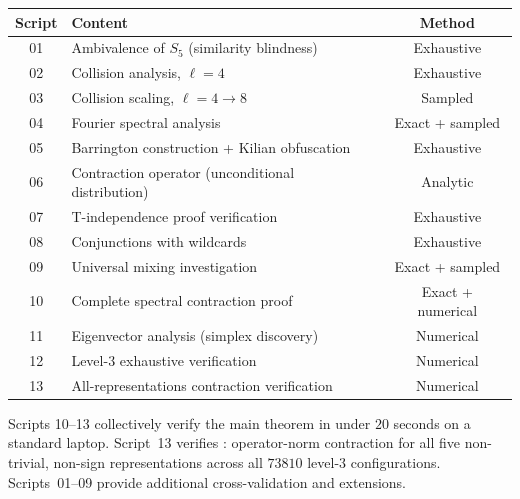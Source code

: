 \documentclass[11pt]{article}
\begin{document}
\begin{center}
\begin{tabular}{clc}
\toprule
Script & Content & Method \\
\midrule
01 & Ambivalence of $S_5$ (similarity blindness) & Exhaustive \\
02 & Collision analysis, $\ell = 4$ & Exhaustive \\
03 & Collision scaling, $\ell = 4 \to 8$ & Sampled \\
04 & Fourier spectral analysis & Exact + sampled \\
05 & Barrington construction + Kilian obfuscation & Exhaustive \\
06 & Contraction operator (unconditional distribution) & Analytic \\
07 & T-independence proof verification & Exhaustive \\
08 & Conjunctions with wildcards & Exhaustive \\
09 & Universal mixing investigation & Exact + sampled \\
10 & Complete spectral contraction proof & Exact + numerical \\
11 & Eigenvector analysis (simplex discovery) & Numerical \\
12 & Level-$3$ exhaustive verification & Numerical \\
13 & All-representations contraction verification & Numerical \\
\bottomrule
\end{tabular}
\end{center}

Scripts 10--13 collectively verify the main theorem in under $20$ seconds
on a standard laptop. Script~13 verifies :
operator-norm contraction for all five non-trivial, non-sign representations
across all $73810$ level-$3$ configurations.
Scripts~01--09 provide additional cross-validation and extensions.



\clearpage
\end{document}
